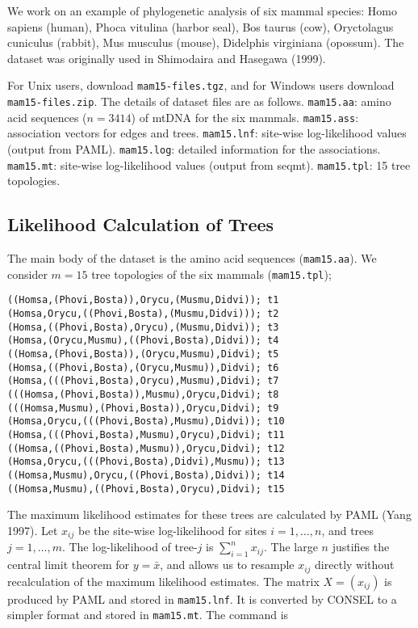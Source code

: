 \documentclass[a4paper]{amsart}
\begin{document}
We work on an example of phylogenetic analysis of six mammal species:
Homo sapiens (human), Phoca vitulina (harbor seal), Bos taurus (cow),
Oryctolagus cuniculus (rabbit), Mus musculus (mouse), Didelphis
virginiana (opossum). The dataset was originally used in Shimodaira
and Hasegawa (1999). 

For Unix users, download {\tt mam15-files.tgz}, and for Windows users
download {\tt mam15-files.zip}.  The details of dataset files are as
follows.  {\tt mam15.aa}: amino acid sequences ($n=3414$) of mtDNA for
the six mammals.  {\tt mam15.ass}: association vectors for edges and
trees.  {\tt mam15.lnf}: site-wise log-likelihood values (output from
PAML).  {\tt mam15.log}: detailed information for the associations.
{\tt mam15.mt}: site-wise log-likelihood values (output from seqmt).
{\tt mam15.tpl}: 15 tree topologies.

\subsection{Likelihood Calculation of Trees}

The main body of the dataset is the amino acid sequences ({\tt mam15.aa}).
We  consider $m=15$ tree topologies of the six mammals ({\tt mam15.tpl});
\begin{verbatim}  
((Homsa,(Phovi,Bosta)),Orycu,(Musmu,Didvi)); t1
(Homsa,Orycu,((Phovi,Bosta),(Musmu,Didvi))); t2
(Homsa,((Phovi,Bosta),Orycu),(Musmu,Didvi)); t3
(Homsa,(Orycu,Musmu),((Phovi,Bosta),Didvi)); t4
((Homsa,(Phovi,Bosta)),(Orycu,Musmu),Didvi); t5
(Homsa,((Phovi,Bosta),(Orycu,Musmu)),Didvi); t6
(Homsa,(((Phovi,Bosta),Orycu),Musmu),Didvi); t7
(((Homsa,(Phovi,Bosta)),Musmu),Orycu,Didvi); t8
(((Homsa,Musmu),(Phovi,Bosta)),Orycu,Didvi); t9
(Homsa,Orycu,(((Phovi,Bosta),Musmu),Didvi)); t10
(Homsa,(((Phovi,Bosta),Musmu),Orycu),Didvi); t11
((Homsa,((Phovi,Bosta),Musmu)),Orycu,Didvi); t12
(Homsa,Orycu,(((Phovi,Bosta),Didvi),Musmu)); t13
((Homsa,Musmu),Orycu,((Phovi,Bosta),Didvi)); t14
((Homsa,Musmu),((Phovi,Bosta),Orycu),Didvi); t15
\end{verbatim}
The maximum likelihood estimates for these trees are calculated by
PAML (Yang 1997).  Let $x_{ij}$ be the site-wise log-likelihood for
sites $i=1,\ldots,n$, and trees $j=1,\ldots,m$. The log-likelihood of
tree-$j$ is $\sum_{i=1}^n x_{ij}$. The large $n$ justifies the central
limit theorem for $y=\bar x$, and allows us to resample $x_{ij}$
directly without recalculation of the maximum likelihood
estimates. The matrix $X=(x_{ij})$ is produced by PAML and stored in
{\tt mam15.lnf}.  It is converted by CONSEL to a simpler format and
stored in {\tt mam15.mt}. The command is
\end{document}
